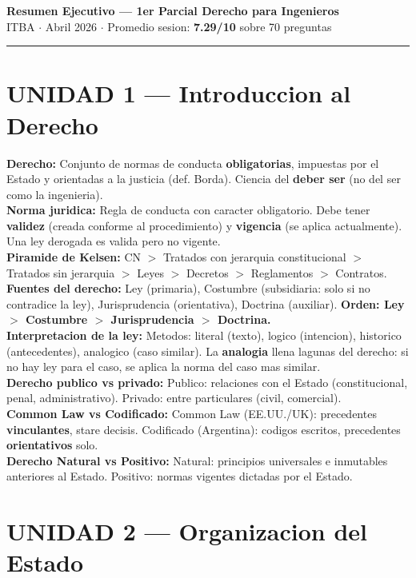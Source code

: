 \documentclass[10pt, a4paper]{article}
\newcommand{\D}[2]{\textbf{\color{azul}#1:} #2\\[1pt]}
\begin{document}
\begin{center}
  {\large\bfseries\color{azul} Resumen Ejecutivo --- 1er Parcial Derecho para Ingenieros}\\[2pt]
  {\small ITBA $\cdot$ Abril 2026 $\cdot$ Promedio sesion: \textbf{7.29/10} sobre 70 preguntas}
\end{center}
\vspace{2pt}\hrule\vspace{5pt}

\section*{UNIDAD 1 --- Introduccion al Derecho}

\begin{cajaClave}
\D{Derecho}{Conjunto de normas de conducta \textbf{obligatorias}, impuestas por el Estado y orientadas a la justicia (def. Borda). Ciencia del \textbf{deber ser} (no del ser como la ingenieria).}
\D{Norma juridica}{Regla de conducta con caracter obligatorio. Debe tener \textbf{validez} (creada conforme al procedimiento) y \textbf{vigencia} (se aplica actualmente). Una ley derogada es valida pero no vigente.}
\D{Piramide de Kelsen}{CN $>$ Tratados con jerarquia constitucional $>$ Tratados sin jerarquia $>$ Leyes $>$ Decretos $>$ Reglamentos $>$ Contratos.}
\D{Fuentes del derecho}{Ley (primaria), Costumbre (subsidiaria: solo si no contradice la ley), Jurisprudencia (orientativa), Doctrina (auxiliar). \textbf{Orden: Ley $>$ Costumbre $>$ Jurisprudencia $>$ Doctrina.}}
\D{Interpretacion de la ley}{Metodos: literal (texto), logico (intencion), historico (antecedentes), analogico (caso similar). La \textbf{analogia} llena lagunas del derecho: si no hay ley para el caso, se aplica la norma del caso mas similar.}
\D{Derecho publico vs privado}{Publico: relaciones con el Estado (constitucional, penal, administrativo). Privado: entre particulares (civil, comercial).}
\D{Common Law vs Codificado}{Common Law (EE.UU./UK): precedentes \textbf{vinculantes}, stare decisis. Codificado (Argentina): codigos escritos, precedentes \textbf{orientativos} solo.}
\D{Derecho Natural vs Positivo}{Natural: principios universales e inmutables anteriores al Estado. Positivo: normas vigentes dictadas por el Estado.}
\end{cajaClave}

\section*{UNIDAD 2 --- Organizacion del Estado}
\end{document}
